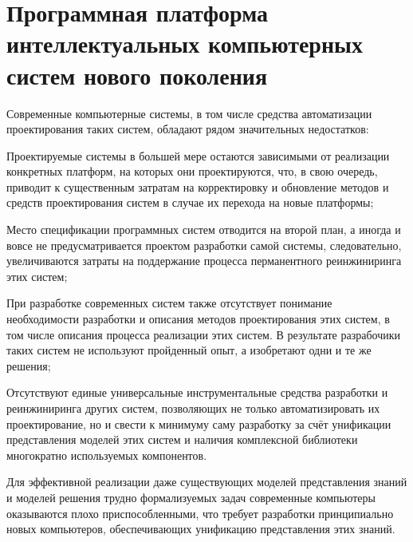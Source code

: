 \chapter{Программная платформа интеллектуальных компьютерных систем нового поколения}
\label{chapter_soft_platform}


Современные компьютерные системы, в том числе средства автоматизации проектирования таких систем, обладают рядом
значительных недостатков:
\begin{scnitemize}
    \item Проектируемые системы в большей мере остаются зависимыми от реализации конкретных платформ, на которых они
    проектируются, что, в свою очередь, приводит к существенным затратам на корректировку и обновление методов и
    средств проектирования систем в случае их перехода на новые платформы;
    \item Место спецификации программных систем отводится на второй план, а иногда и вовсе не предусматривается
    проектом разработки самой системы, следовательно, увеличиваются затраты на поддержание процесса перманентного
    реинжиниринга этих систем;
    \item При разработке современных систем также отсутствует понимание необходимости разработки и описания методов
    проектирования этих систем, в том числе описания процесса реализации этих систем. В результате разрабочики таких
    систем не используют пройденный опыт, а изобретают одни и те же решения;
    \item Отсутствуют единые универсальные инструментальные средства разработки и реинжиниринга других систем,
    позволяющих не только автоматизировать их проектирование, но и свести к минимуму саму разработку за счёт
    унификации представления моделей этих систем и наличия комплексной библиотеки многократно используемых компонентов.
    \item Для эффективной реализации даже существующих моделей представления знаний и моделей решения трудно
    формализуемых задач современные компьютеры оказываются плохо приспособленными, что требует разработки принципиально
    новых компьютеров, обеспечивающих унификацию представления этих знаний.
\end{scnitemize}

